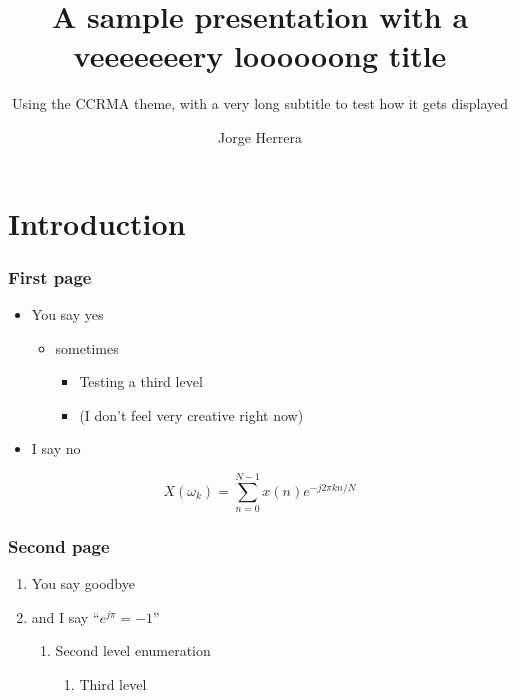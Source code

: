 \documentclass{beamer}
\title{A sample presentation with a veeeeeeery loooooong title}
\subtitle{Using the CCRMA theme, with a very long subtitle to test how it gets displayed}
\author{Jorge Herrera}
\date
\begin{document}
\begin{frame}[plain]
    \titlepage
\end{frame}
\addtocounter{framenumber}{-1}  %


\begin{frame}[plain]
    \tableofcontents
\end{frame}
\addtocounter{framenumber}{-1}  %

\section[Intro]{Introduction}
\begin{frame}[plain]
    \tableofcontents[currentsection]
\end{frame}
\addtocounter{framenumber}{-1}  %

\begin{frame}\frametitle{First page}
    \begin{itemize}
    \item You say yes
        \begin{itemize}
        \item sometimes
            \begin{itemize}
            \item Testing a third level
            \item (I don't feel very creative right now)
            \end{itemize}
        \end{itemize}
    \item I say no
    \end{itemize}

    \begin{equation}
    X(\omega_k) = \sum_{n=0}^{N-1}x(n)e^{-j2\pi kn/N}
    \end{equation}

\end{frame}

\begin{frame}\frametitle{Second page}
    \begin{enumerate}
    \item You say goodbye
    \item and I say ``$e^{j \pi} = -1$''
        \begin{enumerate}
        \item Second level enumeration
            \begin{enumerate}
            \item Third level
            \end{enumerate}
        \end{enumerate}
    \end{enumerate}
\end{frame}
\end{document}
